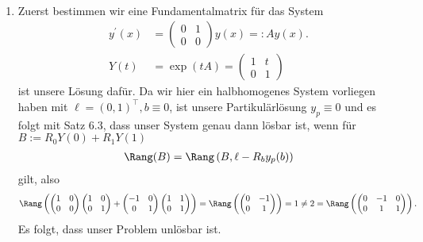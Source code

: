 \begin{solution}
\leavevmode \\
\begin{enumerate}[label = \textbf{\alph*)}]
  \item Zuerst bestimmen wir eine Fundamentalmatrix für das System
  \begin{align*}
    y^{\prime}(x) &= \begin{pmatrix}
      0 & 1 \\ 0 & 0
    \end{pmatrix}y(x) =: A y(x). \\
  Y(t) &= \exp(tA) = \begin{pmatrix}
    1 & t \\ 0 & 1
  \end{pmatrix}
  \end{align*}
  ist unsere Lösung dafür. Da wir hier ein halbhomogenes System vorliegen haben
  mit $\ell = (0,1)^{\top}, b \equiv 0$, ist
  unsere Partikulärlösung $y_p \equiv 0$ und es folgt mit Satz 6.3, dass unser
  System genau dann lösbar ist, wenn für $B := R_0Y(0) + R_1Y(1)$
  \begin{align*}
    \Rang(B) = \Rang\left(B,\ell - R_by_p(b)\right)
  \end{align*}
  gilt, also
  \begin{align*}
    \Rang\left(\begin{pmatrix}
      1 & 0 \\ 0 & 0
    \end{pmatrix}\begin{pmatrix}
      1 & 0 \\ 0 & 1
    \end{pmatrix} +
    \begin{pmatrix}
      -1 & 0 \\ 0 & 1
    \end{pmatrix}
    \begin{pmatrix}
      1 & 1 \\ 0 & 1
    \end{pmatrix}\right) =
    \Rang\left(\begin{pmatrix}
      0 & -1 \\ 0 & 1
    \end{pmatrix}\right) = 1 \neq 2 =
    \Rang\left(\begin{pmatrix}
      0 & -1 & 0\\ 0 & 1 & 1
    \end{pmatrix}\right).
  \end{align*}
  Es folgt, dass unser Problem unlösbar ist.

\end{enumerate}
\end{solution}
